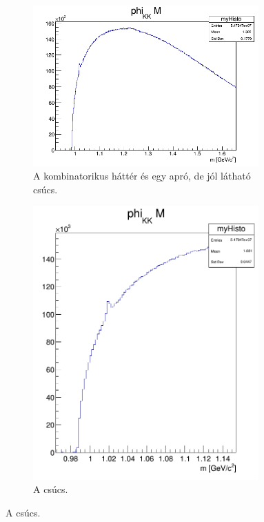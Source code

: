 \documentclass[a4paper,12pt]{article}
\begin{document}
\begin{figure}[H]
	\centering
	\begin{subfigure}{0.49\textwidth}
		\centering
		\includegraphics[width=0.95\textwidth]{phi_KK_M.png}
		\caption{ A kombinatorikus háttér és egy apró, de jól látható csúcs. }
	\end{subfigure}
	\begin{subfigure}{0.49\textwidth}
		\centering
		\includegraphics[width=0.95\textwidth]{phi_KK_Mzoom.png}
		\caption{ A csúcs. }
	\end{subfigure}
\end{figure}
\end{document}
